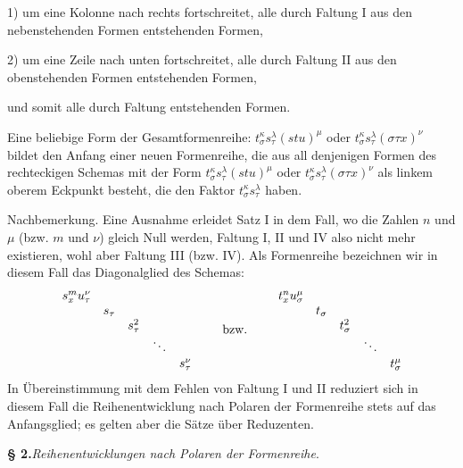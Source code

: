 1) um eine Kolonne nach rechts fortschreitet, alle durch Faltung I aus den nebenstehenden Formen entstehenden Formen,

2) um eine Zeile nach unten fortschreitet, alle durch Faltung II aus den obenstehenden Formen entstehenden Formen,

und somit alle durch Faltung entstehenden Formen.

Eine beliebige Form der Gesamtformenreihe: $t_\sigma^\kappa s_\tau^\lambda(stu)^\mu$ oder $t_\sigma^\kappa s_\tau^\lambda(\sigma\tau x)^\nu$ bildet den Anfang einer neuen Formenreihe, die aus all denjenigen Formen des rechteckigen Schemas mit der Form $t_\sigma^\kappa s_\tau^\lambda(stu)^\mu$ oder $t_\sigma^\kappa s_\tau^\lambda(\sigma\tau x)^\nu$ als linkem oberem Eckpunkt besteht, die den Faktor $t_\sigma^\kappa s_\tau^\lambda$ haben.

Nachbemerkung. Eine Ausnahme erleidet Satz I in dem Fall, wo die Zahlen $n$ und $\mu$ (bzw. $m$ und $\nu$) gleich Null werden, Faltung I, II und IV also nicht mehr existieren, wohl aber Faltung III (bzw. IV). Als Formenreihe bezeichnen wir in diesem Fall das Diagonalglied des Schemas:
\[
\begin{array}{c@{\qquad}c@{\qquad}c}
\begin{array}{ccccc}
s_x^m u_\tau^\nu &&&&\\
&s_\tau&&&\\
&&s_\tau^2&&\\
&&&\ddots&\\
&&&&s_\tau^\nu
\end{array}
&\text{bzw.}&
\begin{array}{ccccc}
t_x^n u_\sigma^\mu &&&&\\
&t_\sigma&&&\\
&&t_\sigma^2&&\\
&&&\ddots&\\
&&&&t_\sigma^\mu
\end{array}
\end{array}
\]
In Übereinstimmung mit dem Fehlen von Faltung I und II reduziert sich in diesem Fall die Reihenentwicklung nach Polaren der Formenreihe stets auf das Anfangsglied; es gelten aber die Sätze über Reduzenten.

\begin{center}
\textbf{§ 2.}\quad \emph{Reihenentwicklungen nach Polaren der Formenreihe}.
\end{center}

